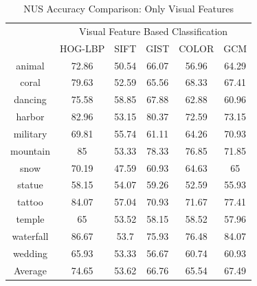\begin{table}
\centering
\caption{ NUS Accuracy Comparison: Only Visual Features} %
\vspace*{0.2 cm}
\begin{tabular}{| c | c | c | c | c | c |}
\hline
 {\multirow{2}{*}{Labels}} & \multicolumn{5}{|c|}{Visual Feature Based Classification} \\
 \cline{2-6}
  & HOG-LBP & SIFT & GIST & COLOR & GCM \\  [1ex] \hline
animal & 72.86 & 50.54 & 66.07 & 56.96 & 64.29 \\  [1ex] \hline
coral & 79.63 & 52.59 & 65.56 & 68.33 & 67.41 \\  [1ex] \hline
dancing & 75.58 & 58.85 & 67.88 & 62.88 & 60.96 \\  [1ex] \hline
harbor & 82.96 & 53.15 & 80.37 & 72.59 & 73.15 \\  [1ex] \hline
military & 69.81 & 55.74 & 61.11 & 64.26 & 70.93 \\  [1ex] \hline
mountain & 85 & 53.33 & 78.33 & 76.85 & 71.85 \\  [1ex] \hline
snow & 70.19 & 47.59 & 60.93 & 64.63 & 65 \\  [1ex] \hline
statue & 58.15 & 54.07 & 59.26 & 52.59 & 55.93 \\  [1ex] \hline
tattoo & 84.07 & 57.04 & 70.93 & 71.67 & 77.41 \\  [1ex] \hline
temple & 65 & 53.52 & 58.15 & 58.52 & 57.96 \\  [1ex] \hline
waterfall & 86.67 & 53.7 & 75.93 & 76.48 & 84.07 \\  [1ex] \hline
wedding & 65.93 & 53.33 & 56.67 & 60.74 & 60.93 \\  [1ex] \hline
Average & 74.65 & 53.62 & 66.76 & 65.54 & 67.49 \\  [1ex] \hline
\end{tabular}
\label{NUSAccuracyVisual} %
\end{table}

